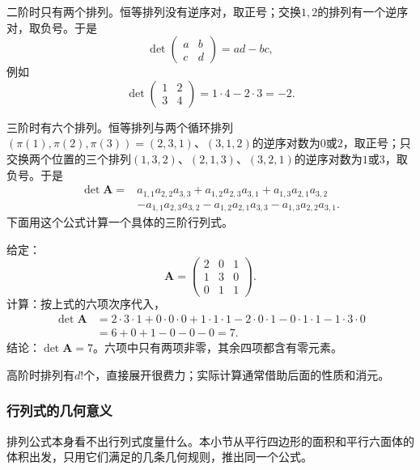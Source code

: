 二阶时只有两个排列。恒等排列没有逆序对，取正号；交换$1,2$的排列有一个逆序对，取负号。于是
\[
 \det\begin{pmatrix}a&b\\c&d\end{pmatrix}=ad-bc,
\]
例如
\[
 \det\begin{pmatrix}1&2\\3&4\end{pmatrix}=1\cdot4-2\cdot3=-2.
\]

三阶时有六个排列。恒等排列与两个循环排列$(\pi(1),\pi(2),\pi(3))=(2,3,1)$、$(3,1,2)$的逆序对数为$0$或$2$，取正号；只交换两个位置的三个排列$(1,3,2)$、$(2,1,3)$、$(3,2,1)$的逆序对数为$1$或$3$，取负号。于是
\[
 \begin{aligned}
 \det\bm A={}&a_{1,1}a_{2,2}a_{3,3}+a_{1,2}a_{2,3}a_{3,1}+a_{1,3}a_{2,1}a_{3,2}\\
 &-a_{1,1}a_{2,3}a_{3,2}-a_{1,2}a_{2,1}a_{3,3}-a_{1,3}a_{2,2}a_{3,1}.
 \end{aligned}
\]
下面用这个公式计算一个具体的三阶行列式。
\begin{example}[三阶行列式的排列展开]
\label{ex:ls-det-three-by-three}
给定：
\[
 \bm A=\begin{pmatrix}2&0&1\\1&3&0\\0&1&1\end{pmatrix}.
\]
计算：按上式的六项次序代入，
\[
 \begin{aligned}
 \det\bm A&=2\cdot3\cdot1+0\cdot0\cdot0+1\cdot1\cdot1-2\cdot0\cdot1-0\cdot1\cdot1-1\cdot3\cdot0\\
 &=6+0+1-0-0-0=7.
 \end{aligned}
\]
结论：$\det\bm A=7$。六项中只有两项非零，其余四项都含有零元素。
\end{example}
高阶时排列有$d!$个，直接展开很费力；实际计算通常借助后面的性质和消元。

\subsubsection{行列式的几何意义}

排列公式本身看不出行列式度量什么。本小节从平行四边形的面积和平行六面体的体积出发，只用它们满足的几条几何规则，推出同一个公式。

